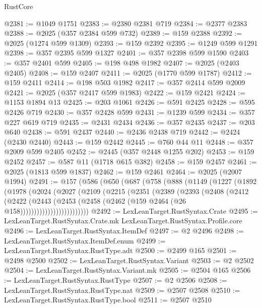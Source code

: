 \begin{lexlean}{RustCore}
\begin{coremodule}
@2381 := @1049 @1751
@2383 := @2380 @2381 @719
@2384 := @2377 @2383
@2388 := @2025 (@357 @2384 @599 @732)
@2389 := @159 @2388
@2392 := @2025 (@1274 @599 @1309)
@2393 := @159 @2392
@2395 := @1249 @599 @1291
@2398 := @357 @2395 @599 @1327
@2401 := @357 @2398 @599 @1590
@2403 := @357 @2401 @599
@2405 := @198 @498 @1982
@2407 := @2025 (@2403 @2405)
@2408 := @159 @2407
@2411 := @2025 (@1770 @599 @1787)
@2412 := @159 @2411
@2414 := @198 @503 @1982
@2417 := @357 @2414 @599 @2009
@2421 := @2025 (@357 @2417 @599 @1983)
@2422 := @159 @2421
@2424 := @1153 @1894 @13
@2425 := @203 @1061
@2426 := @591 @2425
@2428 := @595 @2426 @719
@2430 := @357 @2428 @599
@2431 := @1239 @599
@2434 := @357 @227 @619 @719
@2435 := @2431 @2434
@2436 := @357 @2435
@2437 := @203 @640
@2438 := @591 @2437
@2440 := @2436 @2438 @719
@2442 := @2424 (@2430 @2440)
@2443 := @159 @2442
@2445 := @760 @44 @11
@2448 := @357 @2009 @599 @2405
@2452 := @2445 (@357 @2448 @1255 @202)
@2453 := @159 @2452
@2457 := @587 @11 (@1718 @615 @382)
@2458 := @159 @2457
@2461 := @2025 (@1813 @599 @1837)
@2462 := @159 @2461
@2464 := @2025 (@2007 @1994)
@2491 := @157
    (@586
      (@650
        (@687
          (@758
            (@888
              (@1149
                (@1227
                  (@1892
                    (@1978
                      (@2024
                        (@2027
                          (@2109
                            (@2215
                              (@2351
                                (@2389
                                  (@2393
                                    (@2408
                                      (@2412
                                        (@2422
                                          (@2443
                                            (@2453
                                              (@2458
                                                (@2462
                                                  (@159 @2464 (@26 @158)))))))))))))))))))))))))
@2492 := LexLeanTarget.RustSyntax.Crate
@2495 := LexLeanTarget.RustSyntax.Crate.mk LexLeanTarget.RustSyntax.Profile.core
@2496 := LexLeanTarget.RustSyntax.ItemDef
@2497 := @2 @2496
@2498 := LexLeanTarget.RustSyntax.ItemDef.enum
@2499 := LexLeanTarget.RustSyntax.RustType.adt
@2500 := @2499 @165
@2501 := @2498 @2500
@2502 := LexLeanTarget.RustSyntax.Variant
@2503 := @2 @2502
@2504 := LexLeanTarget.RustSyntax.Variant.mk
@2505 := @2504 @165
@2506 := LexLeanTarget.RustSyntax.RustType
@2507 := @2 @2506
@2508 := LexLeanTarget.RustSyntax.RustType.nat
@2509 := @2507 @2508
@2510 := LexLeanTarget.RustSyntax.RustType.bool
@2511 := @2507 @2510

\end{coremodule}
\end{lexlean}
